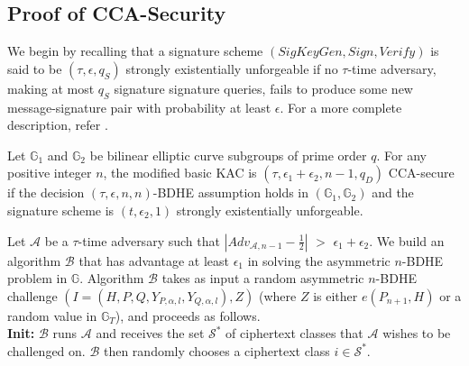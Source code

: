  
\subsection{Proof of CCA-Security}
\label{subsec:proof_cca}

We begin by recalling that a signature scheme $(SigKeyGen,Sign,Verify)$ is said to be $(\tau,\epsilon,q_S)$ strongly existentially unforgeable if no $\tau$-time adversary, making at most $q_{S}$ signature signature queries, fails to produce some new message-signature pair with probability at least $\epsilon$. For a more complete description, refer \cite{canetti2004chosen}.

\begin{Theorem}
\label{th:basicCCA}
Let $\mathbb{G}_1$ and $\mathbb{G}_2$ be bilinear elliptic curve subgroups of prime order $q$. For any positive integer $n$, the modified basic KAC is $(\tau,\epsilon_1+\epsilon_2,n-1,q_D)$ CCA-secure if the decision $(\tau,\epsilon,n,n)$-BDHE assumption holds in $(\mathbb{G}_1,\mathbb{G}_2)$ and the signature scheme is $(t,\epsilon_2,1)$ strongly existentially unforgeable.
\end{Theorem}

 Let $\mathcal{A}$ be a $\tau$-time adversary such that $|Adv_{\mathcal{A},n-1}-\frac{1}{2}|$ $>$  $\epsilon_1+\epsilon_2$. We build an algorithm $\mathcal{B}$ that has advantage at least $\epsilon_1$ in solving the asymmetric $n$-BDHE problem in $\mathbb{G}$. Algorithm $\mathcal{B}$ takes as input a random asymmetric $n$-BDHE challenge $(I=(H,P,Q,Y_{P,\alpha,l},Y_{Q,\alpha,l}),Z)$ (where $Z$ is either ${e}(P_{n+1},H)$ or a random value in $\mathbb{G}_T$), and proceeds as follows.\\

\noindent\textbf{Init:} $\mathcal{B}$ runs $\mathcal{A}$ and receives the set ${\mathcal{S}}^{*}$ of ciphertext classes that $\mathcal{A}$ wishes to be challenged on. $\mathcal{B}$ then randomly chooses a ciphertext class $i\in{\mathcal{S}}^{*}$.\\
 
